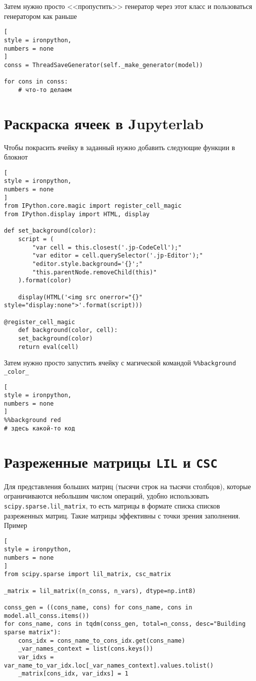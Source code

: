 \documentclass[%
	11pt,
	a4paper,
	utf8,
		]{article}
\begin{document}
Затем нужно просто <<пропустить>> генератор через этот класс и пользоваться генератором как раньше
\begin{lstlisting}[
style = ironpython,
numbers = none
]
conss = ThreadSaveGenerator(self._make_generator(model))

for cons in conss:
    # что-то делаем
\end{lstlisting}



\section{Раскраска ячеек в Jupyterlab}

Чтобы покрасить ячейку в заданный нужно добавить следующие функции в блокнот
\begin{lstlisting}[
style = ironpython,
numbers = none
]
from IPython.core.magic import register_cell_magic
from IPython.display import HTML, display

def set_background(color):    
	script = (
		"var cell = this.closest('.jp-CodeCell');"
		"var editor = cell.querySelector('.jp-Editor');"
		"editor.style.background='{}';"
		"this.parentNode.removeChild(this)"
	).format(color)

	display(HTML('<img src onerror="{}" style="display:none">'.format(script)))

@register_cell_magic
	def background(color, cell):
	set_background(color)
	return eval(cell)
\end{lstlisting}

Затем нужно просто запустить ячейку с магической командой \verb|%%background _color_|
\begin{lstlisting}[
style = ironpython,
numbers = none
]
%%background red
# здесь какой-то код
\end{lstlisting}

\section{Разреженные матрицы \texttt{LIL} и \texttt{CSC}}

Для представления больших матриц (тысячи строк на тысячи столбцов), которые ограничиваются небольшим числом операций, удобно использовать \verb|scipy.sparse.lil_matrix|, то есть матрицы в формате списка списков разреженных матриц. Такие матрицы эффективны с точки зрения заполнения. Пример
\begin{lstlisting}[
style = ironpython,
numbers = none
]
from scipy.sparse import lil_matrix, csc_matrix

_matrix = lil_matrix((n_conss, n_vars), dtype=np.int8)

conss_gen = ((cons_name, cons) for cons_name, cons in model.all_conss.items())
for cons_name, cons in tqdm(conss_gen, total=n_conss, desc="Building sparse matrix"):
	cons_idx = cons_name_to_cons_idx.get(cons_name)
	_var_names_context = list(cons.keys())
	var_idxs = var_name_to_var_idx.loc[_var_names_context].values.tolist()
	_matrix[cons_idx, var_idxs] = 1
\end{lstlisting}
\end{document}
